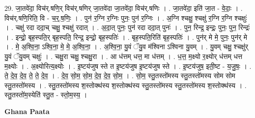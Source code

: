\documentclass[17pt]{extarticle}
\begin{document}
29. जा॒तवे॑दा॒ विच॑र्.षणि॒र् विच॑र्.षणिर् जा॒तवे॑दा जा॒तवे॑दा॒ विच॑र्.षणिः । . जा॒तवे॑दा॒ इति॑ जा॒त - वे॒दाः॒ । . विच॑र्.षणि॒रिति॒ वि - च॒र्॒.ष॒णिः॒ । . पुन॑ र॒ग्नि र॒ग्निः पुनः॒ पुन॑ र॒ग्निः । . अ॒ग्नि श्चक्षु॒ श्चक्षु॑ र॒ग्नि र॒ग्नि श्चक्षुः॑ । . चक्षु॑ रदा ददा॒च् चक्षु॒ श्चक्षु॑ रदात् । . अ॒दा॒त् पुनः॒ पुन॑ रदा ददा॒त् पुनः॑ । . पुन॒ रिन्द्र॒ इन्द्रः॒ पुनः॒ पुन॒ रिन्द्रः॑ । . इन्द्रो॒ बृह॒स्पति॒र् बृह॒स्पति॒ रिन्द्र॒ इन्द्रो॒ बृह॒स्पतिः॑ । . बृह॒स्पति॒रिति॑ बृह॒स्पतिः॑ । . पुन॑र् मे मे॒ पुनः॒ पुन॑र् मे । . मे॒ अ॒श्वि॒ना॒ ऽश्वि॒ना॒ मे॒ मे॒ अ॒श्वि॒ना॒ । . अ॒श्वि॒ना॒ यु॒वं ॅयु॒व म॑श्विना ऽश्विना यु॒वम् । . यु॒वम् चक्षु॒ श्चक्षु॑र् यु॒वं ॅयु॒वम् चक्षुः॑ । . चक्षु॒रा चक्षु॒ श्चक्षु॒रा । . आ ध॑त्तम् धत्त॒ मा ध॑त्तम् । . ध॒त्त॒ म॒क्ष्यो र॒क्ष्योर् ध॑त्तम् धत्त म॒क्ष्योः । . अ॒क्ष्योरित्य॒क्ष्योः । . इ॒ष्टय॑जुष स्ते त इ॒ष्टय॑जुष इ॒ष्टय॑जुष स्ते । . इ॒ष्टय॑जुष॒ इती॒ष्ट - य॒जु॒षः॒ । . ते॒ दे॒व॒ दे॒व॒ ते॒ ते॒ दे॒व॒ । . दे॒व॒ सो॒म॒ सो॒म॒ दे॒व॒ दे॒व॒ सो॒म॒ । . सो॒म॒ स्तु॒तस्तो॑मस्य स्तु॒तस्तो॑मस्य सोम सोम स्तु॒तस्तो॑मस्य । . स्तु॒तस्तो॑मस्य श॒स्तोक्थ॑स्य श॒स्तोक्थ॑स्य स्तु॒तस्तो॑मस्य स्तु॒तस्तो॑मस्य श॒स्तोक्थ॑स्य । . स्तु॒तस्तो॑म॒स्येति॑ स्तु॒त - स्तो॒म॒स्य॒ । \newline

\textbf{Ghana Paata } \newline
\end{document}
